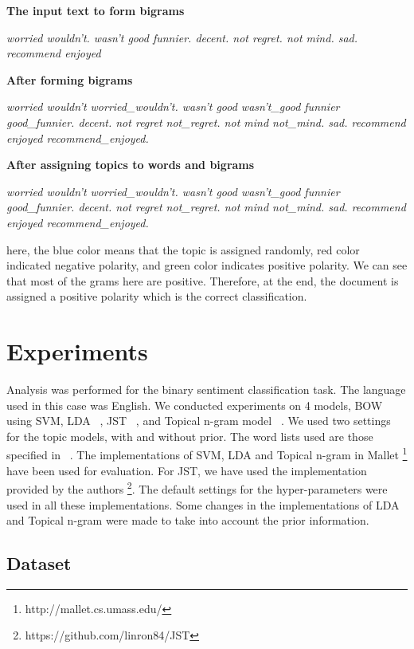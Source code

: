 \textbf{The input text to form bigrams}

\textit{worried wouldn't. wasn't good funnier. decent. not regret. not mind. sad. recommend enjoyed}

\textbf{After forming bigrams}

\textit{worried wouldn't worried\_wouldn't. wasn't good wasn't\_good funnier good\_funnier. decent. not regret not\_regret. not mind not\_mind. sad. recommend enjoyed 
recommend\_enjoyed.}

\textbf{After assigning topics to words and bigrams}

\textit{{\color{blue}worried} {\color{blue}wouldn't worried\_wouldn't.} {\color{red}wasn't good wasn't\_good} {\color{green}funnier good\_funnier.} {\color{green}decent.}
{\color{green}not regret not\_regret.} {\color{green}not mind not\_mind.} {\color{red}sad.} {\color{green}recommend enjoyed recommend\_enjoyed.}}

here, the blue color means that the topic is assigned randomly, red color indicated negative polarity, and green color indicates positive polarity. We can see that most of 
the grams here are positive. Therefore, at the end, the document is assigned a positive polarity which is the correct classification.

\section{Experiments}\label{experiments}

Analysis was performed for the binary sentiment classification task. The language used in this case was English. We conducted experiments on 4 models, BOW using SVM, LDA 
~\citep*{blei2003latent}, JST ~\citep*{lin2009joint}, and Topical n-gram model ~\citep*{wang2007topical}. We used two settings for the topic models, with and without prior. 
The word lists used are those specified in ~\citep*{liu2010sentiment}. The implementations of SVM, LDA and Topical n-gram in Mallet \footnote{http://mallet.cs.umass.edu/} 
have been used for evaluation. For JST, we have used the implementation provided by the authors \footnote{https://github.com/linron84/JST}. The default settings for the
hyper-parameters were used in all these implementations. Some changes in the implementations of LDA and Topical n-gram were made to take into account the prior information.

\subsection{Dataset}

